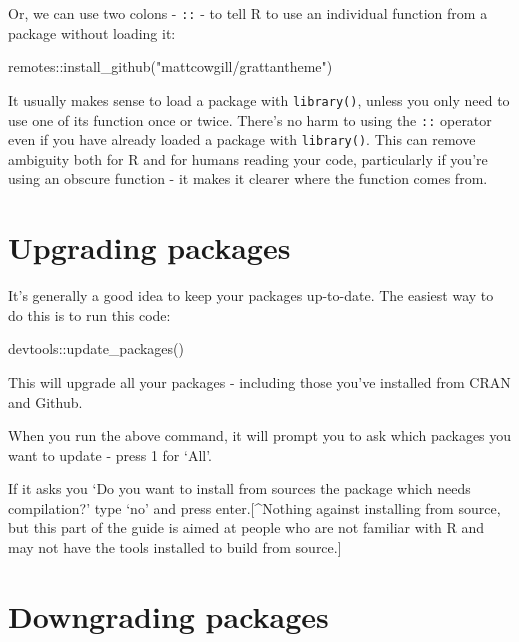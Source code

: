 \documentclass[
]{book}
\newenvironment{Shaded}{\begin{snugshade}}{\end{snugshade}}
\newcommand{\FunctionTok}[1]{\textcolor[rgb]{0.00,0.00,0.00}{#1}}
\newcommand{\NormalTok}[1]{#1}
\newcommand{\SpecialCharTok}[1]{\textcolor[rgb]{0.00,0.00,0.00}{#1}}
\newcommand{\StringTok}[1]{\textcolor[rgb]{0.31,0.60,0.02}{#1}}
\begin{document}
Or, we can use two colons - \texttt{::} - to tell R to use an individual function from a package without loading it:

\begin{Shaded}
\begin{Highlighting}[]
\NormalTok{remotes}\SpecialCharTok{::}\FunctionTok{install\_github}\NormalTok{(}\StringTok{"mattcowgill/grattantheme"}\NormalTok{)}
\end{Highlighting}
\end{Shaded}

It usually makes sense to load a package with \texttt{library()}, unless you only need to use one of its function once or twice. There's no harm to using the \texttt{::} operator even if you have already loaded a package with \texttt{library()}. This can remove ambiguity both for R and for humans reading your code, particularly if you're using an obscure function - it makes it clearer where the function comes from.

\hypertarget{upgrading-packages}{%
\section{Upgrading packages}\label{upgrading-packages}}

It's generally a good idea to keep your packages up-to-date. The easiest way to do this is to run this code:

\begin{Shaded}
\begin{Highlighting}[]
\NormalTok{devtools}\SpecialCharTok{::}\FunctionTok{update\_packages}\NormalTok{()}
\end{Highlighting}
\end{Shaded}

This will upgrade all your packages - including those you've installed from CRAN and Github.

When you run the above command, it will prompt you to ask which packages you want to update - press 1 for `All'.

If it asks you `Do you want to install from sources the package which needs compilation?' type `no' and press enter.{[}\^{}Nothing against installing from source, but this part of the guide is aimed at people who are not familiar with R and may not have the tools installed to build from source.{]}

\hypertarget{downgrading-packages}{%
\section{Downgrading packages}\label{downgrading-packages}}
\end{document}
